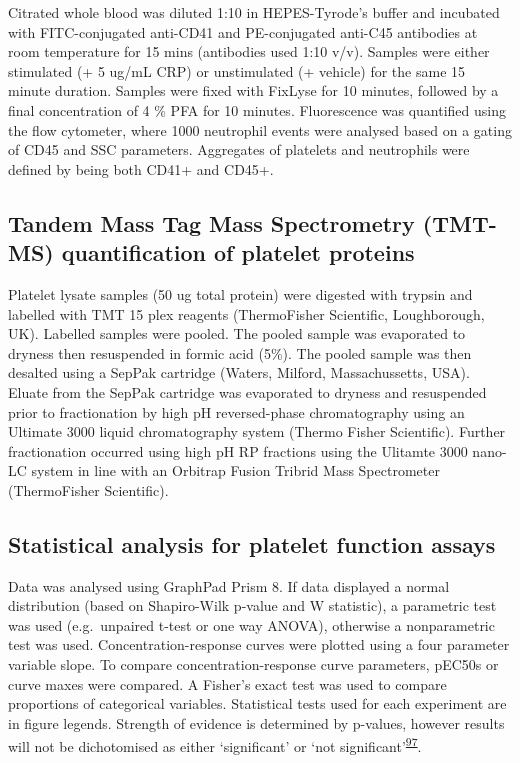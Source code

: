 \documentclass[11pt,twoside]{bristolthesis}
\begin{document}
Citrated whole blood was diluted 1:10 in HEPES-Tyrode's buffer and incubated with FITC-conjugated anti-CD41 and PE-conjugated anti-C45 antibodies at room temperature for 15 mins (antibodies used 1:10 v/v). Samples were either stimulated (+ 5 ug/mL CRP) or unstimulated (+ vehicle) for the same 15 minute duration. Samples were fixed with FixLyse for 10 minutes, followed by a final concentration of 4 \% PFA for 10 minutes. Fluorescence was quantified using the flow cytometer, where 1000 neutrophil events were analysed based on a gating of CD45 and SSC parameters. Aggregates of platelets and neutrophils were defined by being both CD41+ and CD45+.

\hypertarget{tandem-mass-tag-mass-spectrometry-tmt-ms-quantification-of-platelet-proteins}{%
\subsection{Tandem Mass Tag Mass Spectrometry (TMT-MS) quantification of platelet proteins}\label{tandem-mass-tag-mass-spectrometry-tmt-ms-quantification-of-platelet-proteins}}

Platelet lysate samples (50 ug total protein) were digested with trypsin and labelled with TMT 15 plex reagents (ThermoFisher Scientific, Loughborough, UK). Labelled samples were pooled. The pooled sample was evaporated to dryness then resuspended in formic acid (5\%). The pooled sample was then desalted using a SepPak cartridge (Waters, Milford, Massachussetts, USA). Eluate from the SepPak cartridge was evaporated to dryness and resuspended prior to fractionation by high pH reversed-phase chromatography using an Ultimate 3000 liquid chromatography system (Thermo Fisher Scientific). Further fractionation occurred using high pH RP fractions using the Ulitamte 3000 nano-LC system in line with an Orbitrap Fusion Tribrid Mass Spectrometer (ThermoFisher Scientific).

\hypertarget{statistical-analysis-for-platelet-function-assays}{%
\subsection{Statistical analysis for platelet function assays}\label{statistical-analysis-for-platelet-function-assays}}

Data was analysed using GraphPad Prism 8. If data displayed a normal distribution (based on Shapiro-Wilk p-value and W statistic), a parametric test was used (e.g.~unpaired t-test or one way ANOVA), otherwise a nonparametric test was used. Concentration-response curves were plotted using a four parameter variable slope. To compare concentration-response curve parameters, pEC50s or curve maxes were compared. A Fisher's exact test was used to compare proportions of categorical variables. Statistical tests used for each experiment are in figure legends. Strength of evidence is determined by p-values, however results will not be dichotomised as either `significant' or `not significant'\textsuperscript{\protect\hyperlink{ref-Sterne2001}{97}}.
\end{document}
